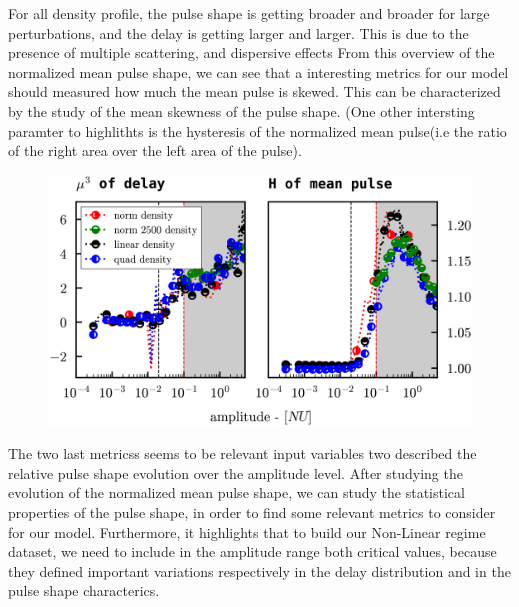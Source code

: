 \documentclass[11pt,a4paper,openany]{report}
\begin{document}
\begin{multicols}{2}
\begin{figure}[H]
        \label{fig:barrier}
    \end{figure}

    For all density profile, the pulse shape is getting broader and broader for large perturbations, and the delay is getting larger and larger. This is due to the presence of multiple scattering, and dispersive effects From this overview of the normalized mean pulse shape, we can see that a interesting metrics for our model should measured how much the mean pulse is skewed. This can be characterized by the study of the mean skewness of the pulse shape. (One other intersting paramter to highlithts is the hysteresis of the normalized mean pulse(i.e the ratio of the right area over the left area of the pulse).

    \begin{figure}[H]
        \centering
        \includegraphics[width=1\linewidth]{./figures/skew_Hyst.png}
        \label{}
    \end{figure}


    The two last metricss seems to be relevant input variables two described the relative pulse shape evolution over the amplitude level. After studying the evolution of the normalized mean pulse shape, we can study the statistical properties of the pulse shape, in order to find some relevant metrics to consider for our model. Furthermore, it highlights that to build our Non-Linear regime dataset, we need to include in the amplitude range both critical values, because they defined important variations respectively in the delay distribution and in the pulse shape characterics.

\end{multicols}
\end{document}

